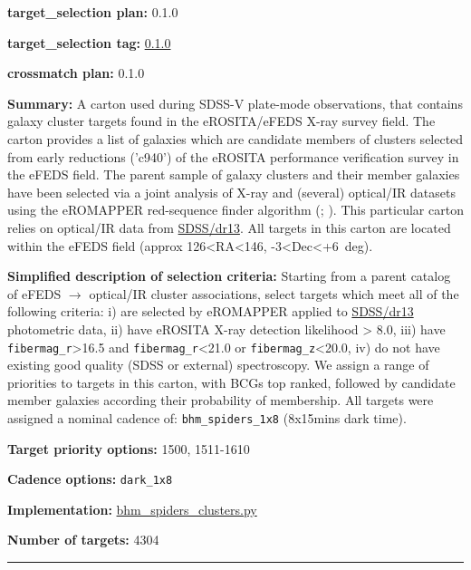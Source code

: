 \noindent\textbf{target\_selection plan:} 0.1.0

\noindent\textbf{target\_selection tag:}
\href{https://github.com/sdss/target_selection/tree/0.1.0/}{0.1.0}

\noindent\textbf{crossmatch plan:} 0.1.0

\noindent\textbf{Summary:} A carton used during SDSS-V plate-mode observations,
that contains galaxy cluster targets found in the eROSITA/eFEDS X-ray
survey field. The carton provides a list of galaxies which are candidate
members of clusters selected from early reductions ('c940') of the
eROSITA performance verification survey in the eFEDS field. The parent
sample of galaxy clusters and their member galaxies have been selected
via a joint analysis of X-ray and (several) optical/IR datasets using
the eROMAPPER red-sequence finder algorithm
(\citealt{Rykoff2014};
\citealt{IderChitham2020}). This particular carton relies on optical/IR data
from \href{https://www.sdss.org/dr13/}{SDSS/dr13}. All targets in this
carton are located within the eFEDS field (approx
126\textless RA\textless146, -3\textless Dec\textless+6~deg).

\noindent\textbf{Simplified description of selection criteria:} Starting from a
parent catalog of eFEDS $\rightarrow$ optical/IR cluster associations, select
targets which meet all of the following criteria: i) are selected by
eROMAPPER applied to \href{https://www.sdss.org/dr13/}{SDSS/dr13}
photometric data, ii) have eROSITA X-ray detection likelihood
\textgreater{} 8.0, iii) have \texttt{fibermag\_r}\textgreater16.5 and
\texttt{fibermag\_r}\textless21.0 or \texttt{fibermag\_z}\textless20.0,
iv) do not have existing good quality (SDSS or external) spectroscopy.
We assign a range of priorities to targets in this carton, with BCGs top
ranked, followed by candidate member galaxies according their
probability of membership. All targets were assigned a nominal cadence
of: \texttt{bhm\_spiders\_1x8} (8x15mins dark time).


\noindent\textbf{Target priority options:} 1500, 1511-1610

\noindent\textbf{Cadence options:} \texttt{dark\_1x8}

\noindent\textbf{Implementation:}
\href{https://github.com/sdss/target_selection/blob/0.1.0/python/target_selection/cartons/bhm_spiders_clusters.py}{bhm\_spiders\_clusters.py}

\noindent\textbf{Number of targets:} 4304

\begin{center}\rule{0.5\linewidth}{0.5pt}\end{center}

